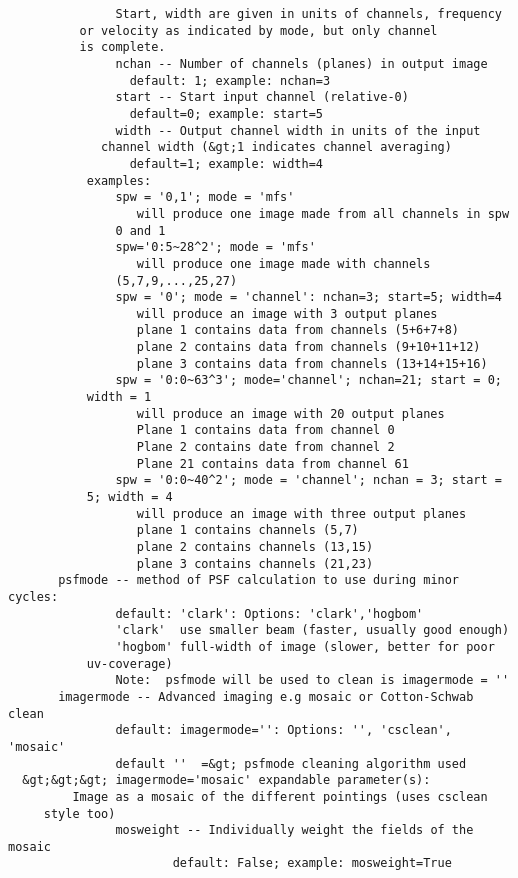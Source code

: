 \begin{verbatim}
               Start, width are given in units of channels, frequency 
 		  or velocity as indicated by mode, but only channel
 		  is complete.
               nchan -- Number of channels (planes) in output image
                 default: 1; example: nchan=3
               start -- Start input channel (relative-0)
                 default=0; example: start=5
               width -- Output channel width in units of the input
 		     channel width (&gt;1 indicates channel averaging)
                 default=1; example: width=4
           examples:
               spw = '0,1'; mode = 'mfs'
                  will produce one image made from all channels in spw 
 		       0 and 1
               spw='0:5~28^2'; mode = 'mfs'
                  will produce one image made with channels 
 		       (5,7,9,...,25,27)
               spw = '0'; mode = 'channel': nchan=3; start=5; width=4
                  will produce an image with 3 output planes
                  plane 1 contains data from channels (5+6+7+8)
                  plane 2 contains data from channels (9+10+11+12)
                  plane 3 contains data from channels (13+14+15+16)
               spw = '0:0~63^3'; mode='channel'; nchan=21; start = 0; 
 		   width = 1
                  will produce an image with 20 output planes
                  Plane 1 contains data from channel 0
                  Plane 2 contains date from channel 2
                  Plane 21 contains data from channel 61
               spw = '0:0~40^2'; mode = 'channel'; nchan = 3; start = 
 		   5; width = 4
                  will produce an image with three output planes
                  plane 1 contains channels (5,7)
                  plane 2 contains channels (13,15)
                  plane 3 contains channels (21,23)
       psfmode -- method of PSF calculation to use during minor cycles:
               default: 'clark': Options: 'clark','hogbom'
               'clark'  use smaller beam (faster, usually good enough)
               'hogbom' full-width of image (slower, better for poor 
 	       uv-coverage)
               Note:  psfmode will be used to clean is imagermode = ''
       imagermode -- Advanced imaging e.g mosaic or Cotton-Schwab clean
               default: imagermode='': Options: '', 'csclean', 'mosaic'
               default ''  =&gt; psfmode cleaning algorithm used
  &gt;&gt;&gt; imagermode='mosaic' expandable parameter(s):
         Image as a mosaic of the different pointings (uses csclean 
 	 style too)
               mosweight -- Individually weight the fields of the mosaic
                       default: False; example: mosweight=True

\end{verbatim}
